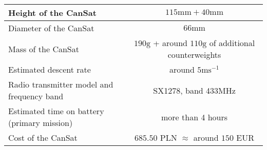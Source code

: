 \documentclass[class=report, crop=false]{standalone}
\newcommand\newcol[0]{\\\hline}
\begin{document}
\begin{tabular}{|l|c|}
  \hline
  Height of the CanSat & $115\text{mm} + 40\text{mm}$
  \newcol
  Diameter of the CanSat & $66\text{mm}$
  \newcol
  Mass of the CanSat & $190\text{g}$ + around $110\text{g}$ of additional counterweights
  \newcol
  Estimated descent rate & around $5\text{m}\text{s}^{-1}$
  \newcol
  Radio transmitter model and frequency band & SX1278, band 433MHz
  \newcol
  Estimated time on battery (primary mission) & more than 4 hours
  \newcol
  Cost of the CanSat & $685.50$ PLN $\approx$ around $150$ EUR
  \newcol
\end{tabular}
\end{document}
